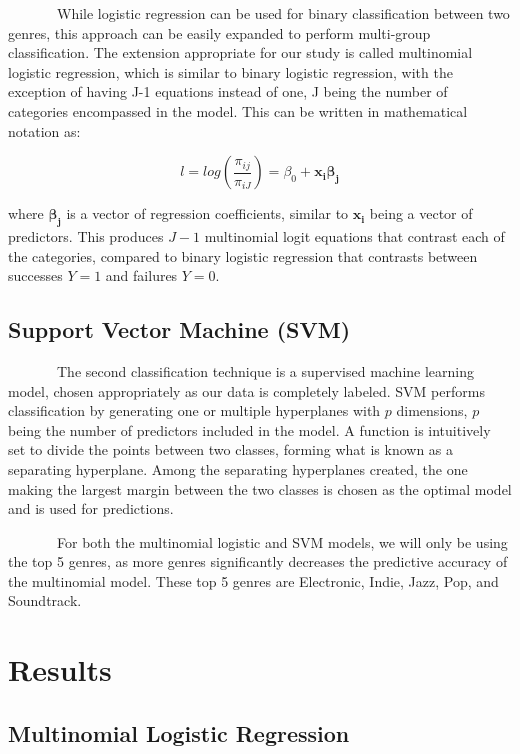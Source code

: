 \documentclass[
]{article}
\begin{document}
~~~~~~~While logistic regression can be used for binary classification
between two genres, this approach can be easily expanded to perform
multi-group classification. The extension appropriate for our study is
called multinomial logistic regression, which is similar to binary
logistic regression, with the exception of having J-1 equations instead
of one, J being the number of categories encompassed in the model. This
can be written in mathematical notation as:

\[
l = log( \frac{\pi_{ij}}{\pi_{iJ}} )= \beta_0 + \mathbf{x_i} \boldsymbol{\beta_j}
\]

where \(\boldsymbol{\beta_j}\) is a vector of regression coefficients,
similar to \(\mathbf{x_i}\) being a vector of predictors. This produces
\(J-1\) multinomial logit equations that contrast each of the
categories, compared to binary logistic regression that contrasts
between successes \(Y=1\) and failures \(Y=0\).

\hypertarget{support-vector-machine-svm}{%
\subsection{Support Vector Machine
(SVM)}\label{support-vector-machine-svm}}

~~~~~~~The second classification technique is a supervised machine
learning model, chosen appropriately as our data is completely labeled.
SVM performs classification by generating one or multiple hyperplanes
with \(p\) dimensions, \(p\) being the number of predictors included in
the model. A function is intuitively set to divide the points between
two classes, forming what is known as a separating hyperplane. Among the
separating hyperplanes created, the one making the largest margin
between the two classes is chosen as the optimal model and is used for
predictions.

~~~~~~~For both the multinomial logistic and SVM models, we will only be
using the top 5 genres, as more genres significantly decreases the
predictive accuracy of the multinomial model. These top 5 genres are
Electronic, Indie, Jazz, Pop, and Soundtrack.

\hypertarget{results}{%
\section{Results}\label{results}}

\hypertarget{multinomial-logistic-regression}{%
\subsection{Multinomial Logistic
Regression}\label{multinomial-logistic-regression}}
\end{document}
